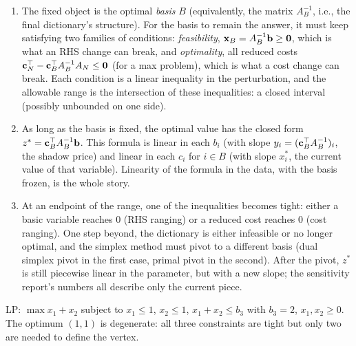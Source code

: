 \begin{enumerate}
\item The fixed object is the optimal \emph{basis} $B$ (equivalently, the matrix $A_B^{-1}$, i.e., the final dictionary's structure). For the basis to remain the answer, it must keep satisfying two families of conditions: \emph{feasibility}, $\mathbf{x}_B = A_B^{-1}\mathbf{b} \ge \mathbf{0}$, which is what an RHS change can break, and \emph{optimality}, all reduced costs $\mathbf{c}_N^\top - \mathbf{c}_B^\top A_B^{-1} A_N \le \mathbf{0}$ (for a max problem), which is what a cost change can break. Each condition is a linear inequality in the perturbation, and the allowable range is the intersection of these inequalities: a closed interval (possibly unbounded on one side).
\item As long as the basis is fixed, the optimal value has the closed form $z^* = \mathbf{c}_B^\top A_B^{-1} \mathbf{b}$. This formula is linear in each $b_i$ (with slope $y_i = (\mathbf{c}_B^\top A_B^{-1})_i$, the shadow price) and linear in each $c_i$ for $i \in B$ (with slope $x_i^*$, the current value of that variable). Linearity of the formula in the data, with the basis frozen, is the whole story.
\item At an endpoint of the range, one of the inequalities becomes tight: either a basic variable reaches $0$ (RHS ranging) or a reduced cost reaches $0$ (cost ranging). One step beyond, the dictionary is either infeasible or no longer optimal, and the simplex method must pivot to a different basis (dual simplex pivot in the first case, primal pivot in the second). After the pivot, $z^*$ is still piecewise linear in the parameter, but with a new slope; the sensitivity report's numbers all describe only the current piece.
\end{enumerate}


LP: $\max x_1 + x_2$ subject to $x_1 \le 1$, $x_2 \le 1$, $x_1 + x_2 \le b_3$ with $b_3 = 2$, $x_1, x_2 \ge 0$. The optimum $(1,1)$ is degenerate: all three constraints are tight but only two are needed to define the vertex.

